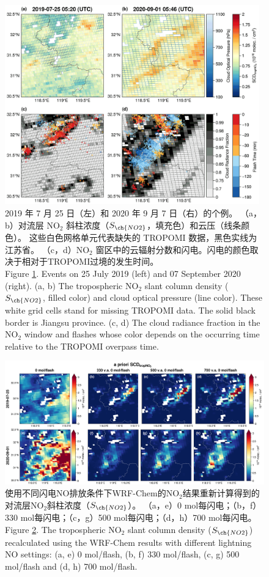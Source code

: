 \begin{figure}[!htbp]
    \centering
    \includegraphics[width=11cm]{./figures/china_flash_scd.png}
    \caption{
    2019 年 7 月 25 日（左）和 2020 年 9 月 7 日（右）的个例。
    （a，b）对流层 NO$_2$ 斜柱浓度（$S_{\ch{NO2}}$，填充色）和云压（线条颜色）。
    这些白色网格单元代表缺失的 TROPOMI 数据，黑色实线为江苏省。
    （c，d）NO$_2$ 窗区中的云辐射分数和闪电。闪电的颜色取决于相对于TROPOMI过境的发生时间。\\
    Figure \ref{fig:china_flash_scd}. Events on 25 July 2019 (left) and 07 September 2020 (right).
    (a, b) The tropospheric NO$_2$ slant column density ($S_{\ch{NO2}}$, filled color) and cloud optical pressure (line color).
    These white grid cells stand for missing TROPOMI data.
    The solid black border is Jiangsu province.
    (c, d) The cloud radiance fraction in the NO$_2$ window and flashes whose color depends on the occurring time relative to the TROPOMI overpass time.
    }
    \label{fig:china_flash_scd}
\end{figure}


\begin{figure}[!htbp]
    \centering
    \includegraphics[width=14cm]{./figures/s5p_apriori_scd.png}
    \caption{使用不同闪电NO排放条件下WRF-Chem的NO$_2$结果重新计算得到的对流层NO$_2$斜柱浓度（$S_{\ch{NO2}}$）。
    （a，e）0 mol每闪电；（b，f）330 mol每闪电；（c，g）500 mol每闪电；（d，h）700 mol每闪电。\\
    Figure \ref{fig:s5p_apriori_scd}. The tropospheric NO$_2$ slant column density ($S_{\ch{NO2}}$) recalculated using the WRF-Chem results with different lightning NO settings: (a, e) 0 mol/flash, (b, f) 330 mol/flash, (c, g) 500 mol/flash and (d, h) 700 mol/flash.
    }
    \label{fig:s5p_apriori_scd}
\end{figure}


